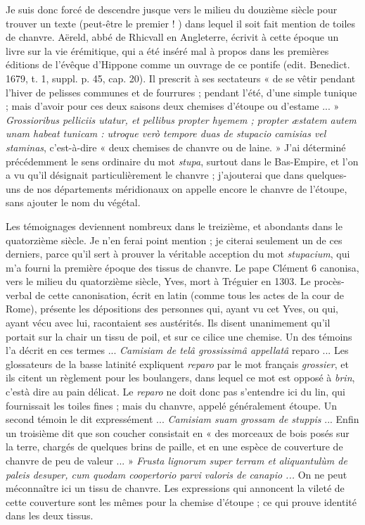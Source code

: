 \documentclass[a4paper, 11pt, oneside, polutonikogreek, french]{article}
\begin{document}
Je suis donc forcé de descendre jusque vers le milieu du douzième siècle pour trouver un texte (peut-être le premier ! ) dans lequel il soit fait mention de toiles de chanvre. Aëreld, abbé de Rhicvall en Angleterre, écrivit à cette époque un livre sur la vie érémitique, qui a été inséré mal à propos dans les premières éditions de l'évêque d'Hippone comme un ouvrage de ce pontife (edit. Benedict. 1679, t. 1, suppl. p. 45, cap. 20). Il prescrit à ses sectateurs « de se vêtir pendant l'hiver de pelisses communes et de fourrures ; pendant l'été, d'une simple tunique ; mais d'avoir pour ces deux saisons deux chemises d'étoupe ou d'estame ... » \emph{Grossioribus pelliciis utatur, et pellibus propter hyemem ; propter æstatem autem unam habeat tunicam : utroque verò tempore duas de stupacio camisias vel staminas}, c'est-à-dire « deux chemises de chanvre ou de laine. » J'ai déterminé précédemment le sens ordinaire du mot \emph{stupa}, surtout dans le Bas-Empire, et l'on a vu qu'il désignait particulièrement le chanvre ; j'ajouterai que dans quelques-uns de nos départements méridionaux on appelle encore le chanvre de l'étoupe, sans ajouter le nom du végétal.

Les témoignages deviennent nombreux dans le treizième, et abondants dans le quatorzième siècle. Je n'en ferai point mention ; je citerai seulement un de ces derniers, parce qu'il sert à prouver la véritable acception du mot \emph{stupacium}, qui m'a fourni la première époque des tissus de chanvre. Le pape Clément 6 canonisa, vers le milieu du quatorzième siècle, Yves, mort à Tréguier en 1303. Le procès-verbal de cette canonisation, écrit en latin (comme tous les actes de la cour de Rome), présente les dépositions des personnes qui, ayant vu cet Yves, ou qui, ayant vécu avec lui, racontaient ses austérités. Ils disent unanimement qu'il portait sur la chair un tissu de poil, et sur ce cilice une chemise. Un des témoins l'a décrit en ces termes ... \emph{Camisiam de telâ grossissimâ appellatâ} reparo ... Les glossateurs de la basse latinité expliquent \emph{reparo} par le mot français \emph{grossier}, et ils citent un règlement pour les boulangers, dans lequel ce mot est opposé à \emph{brin}, c'està dire au pain délicat. Le \emph{reparo} ne doit donc pas s'entendre ici du lin, qui fournissait les toiles fines ; mais du chanvre, appelé généralement étoupe. Un second témoin le dit expressément ... \emph{Camisiam suam grossam de stuppis} ... Enfin un troisième dit que son coucher consistait en « des morceaux de bois posés sur la terre, chargés de quelques brins de paille, et en une espèce de couverture de chanvre de peu de valeur ... » \emph{Frusta lignorum super terram et aliquantulùm de paleis desuper, cum quodam coopertorio parvi valoris de canapio ...} On ne peut méconnaître ici un tissu de chanvre. Les expressions qui annoncent la vileté de cette couverture sont les mêmes pour la chemise d'étoupe ; ce qui prouve identité dans les deux tissus.
\end{document}

